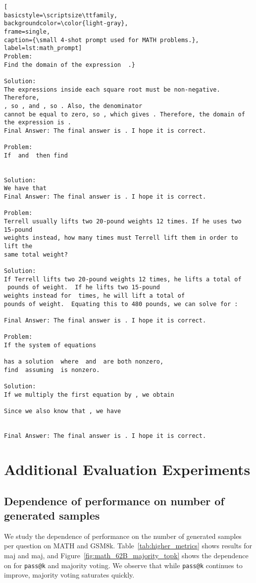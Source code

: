 \documentclass{article}
\makeatletter
\newcommand{\passk}[0]{{\texttt{pass@k} }}
\makeatother
\begin{document}
\begin{lstlisting}[
basicstyle=\scriptsize\ttfamily,
backgroundcolor=\color{light-gray},
frame=single,
caption={\small 4-shot prompt used for MATH problems.},
label=lst:math_prompt]
Problem:
Find the domain of the expression  .}

Solution:
The expressions inside each square root must be non-negative. Therefore, 
, so , and , so . Also, the denominator 
cannot be equal to zero, so , which gives . Therefore, the domain of
the expression is .
Final Answer: The final answer is . I hope it is correct.

Problem:
If  and  then find 


Solution:
We have that 
Final Answer: The final answer is . I hope it is correct.

Problem:
Terrell usually lifts two 20-pound weights 12 times. If he uses two 15-pound 
weights instead, how many times must Terrell lift them in order to lift the
same total weight?

Solution:
If Terrell lifts two 20-pound weights 12 times, he lifts a total of 
 pounds of weight.  If he lifts two 15-pound 
weights instead for  times, he will lift a total of  
pounds of weight.  Equating this to 480 pounds, we can solve for : 

Final Answer: The final answer is . I hope it is correct.

Problem:
If the system of equations

has a solution  where  and  are both nonzero,
find  assuming  is nonzero.

Solution:
If we multiply the first equation by , we obtain

Since we also know that , we have


Final Answer: The final answer is . I hope it is correct.
\end{lstlisting}



\section{Additional Evaluation Experiments}

\subsection{Dependence of performance on number of generated samples}
\label{appendix:perf_vs_k}
We study the dependence of performance on the number of generated samples per question on MATH and GSM8k.
Table~\ref{tab:higher_metrics} shows results for maj and  maj, and Figure~\ref{fig:math_62B_majority_topk} shows the dependence on  for \passk and majority voting. 
We observe that while \passk continues to improve, majority voting saturates quickly.
\end{document}
